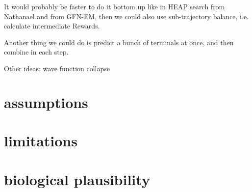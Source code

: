 It would probably be faster to do it bottom up like in HEAP search from Nathanael and from GFN-EM, then we could also use sub-trajectory balance, i.e. calculate intermediate Rewards. 

Another thing we could do is predict a bunch of terminals at once, and then combine in each step. 

Other ideas: wave function collapse

\section{assumptions}
\section{limitations}
\section{biological plausibility}